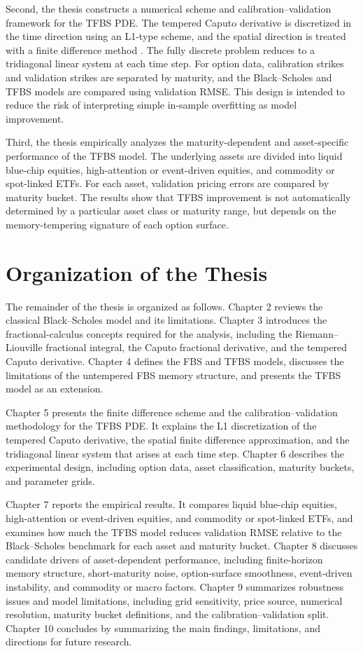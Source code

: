 \documentclass[11pt,a4paper]{report}
\begin{document}
Second, the thesis constructs a numerical scheme and calibration--validation framework for the TFBS PDE. The tempered Caputo derivative is discretized in the time direction using an L1-type scheme, and the spatial direction is treated with a finite difference method \cite{SabzikarMeerschaertChen2015,ZhouGuZhaoLi2024}. The fully discrete problem reduces to a tridiagonal linear system at each time step. For option data, calibration strikes and validation strikes are separated by maturity, and the Black--Scholes and TFBS models are compared using validation RMSE. This design is intended to reduce the risk of interpreting simple in-sample overfitting as model improvement.

Third, the thesis empirically analyzes the maturity-dependent and asset-specific performance of the TFBS model. The underlying assets are divided into liquid blue-chip equities, high-attention or event-driven equities, and commodity or spot-linked ETFs. For each asset, validation pricing errors are compared by maturity bucket. The results show that TFBS improvement is not automatically determined by a particular asset class or maturity range, but depends on the memory-tempering signature of each option surface.

\section{Organization of the Thesis}

The remainder of the thesis is organized as follows. Chapter 2 reviews the classical Black--Scholes model and its limitations. Chapter 3 introduces the fractional-calculus concepts required for the analysis, including the Riemann--Liouville fractional integral, the Caputo fractional derivative, and the tempered Caputo derivative. Chapter 4 defines the FBS and TFBS models, discusses the limitations of the untempered FBS memory structure, and presents the TFBS model as an extension.

Chapter 5 presents the finite difference scheme and the calibration--validation methodology for the TFBS PDE. It explains the L1 discretization of the tempered Caputo derivative, the spatial finite difference approximation, and the tridiagonal linear system that arises at each time step. Chapter 6 describes the experimental design, including option data, asset classification, maturity buckets, and parameter grids.

Chapter 7 reports the empirical results. It compares liquid blue-chip equities, high-attention or event-driven equities, and commodity or spot-linked ETFs, and examines how much the TFBS model reduces validation RMSE relative to the Black--Scholes benchmark for each asset and maturity bucket. Chapter 8 discusses candidate drivers of asset-dependent performance, including finite-horizon memory structure, short-maturity noise, option-surface smoothness, event-driven instability, and commodity or macro factors. Chapter 9 summarizes robustness issues and model limitations, including grid sensitivity, price source, numerical resolution, maturity bucket definitions, and the calibration--validation split. Chapter 10 concludes by summarizing the main findings, limitations, and directions for future research.
\end{document}
